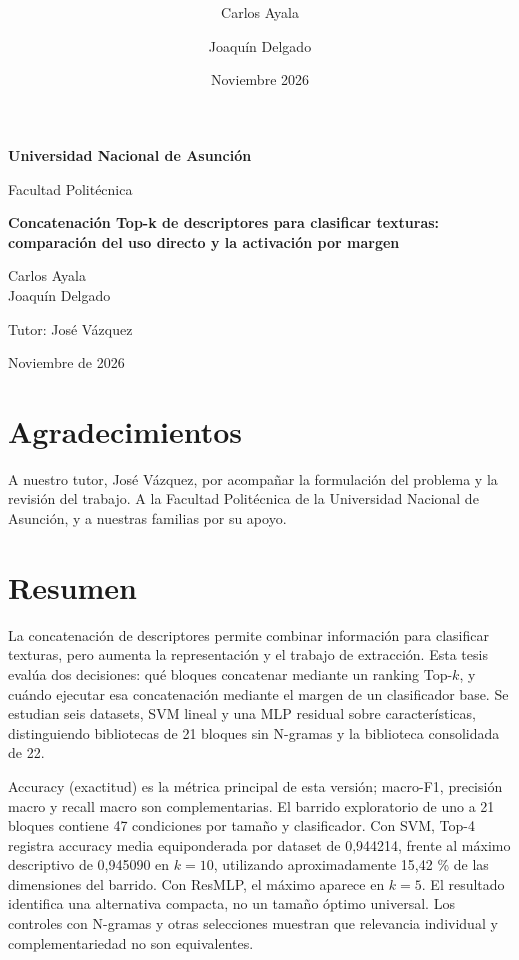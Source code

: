 \documentclass[12pt,a4paper]{report}
\title{\textbf{\titulotesis}}
\author{Carlos Ayala \and Joaquín Delgado}
\date{Noviembre 2026}
\newcommand{\titulotesis}{Concatenación Top-k de descriptores para clasificar texturas: comparación del uso directo y la activación por margen}
\begin{document}
\hypersetup{pageanchor=false}
\begin{titlepage}
\begin{center}
\vspace*{1.4cm}
{\Large\textbf{Universidad Nacional de Asunción}\par}
\vspace{0.4cm}
{\large Facultad Politécnica\par}
\vspace{1.7cm}
{\LARGE\bfseries\titulotesis\par}
\vspace{1.5cm}
{\large Carlos Ayala\\Joaquín Delgado\par}
\vspace{1.1cm}
{\large Tutor: José Vázquez\par}
\vfill
{\large Noviembre de 2026\par}
\end{center}
\end{titlepage}
\clearpage
{}
\hypersetup{pageanchor=true}

\chapter*{Agradecimientos}
A nuestro tutor, José Vázquez, por acompañar la formulación del problema y la revisión del trabajo. A la Facultad Politécnica de la Universidad Nacional de Asunción, y a nuestras familias por su apoyo.

\chapter*{Resumen}
La concatenación de descriptores permite combinar información para clasificar texturas, pero aumenta la representación y el trabajo de extracción. Esta tesis evalúa dos decisiones: qué bloques concatenar mediante un ranking Top-\(k\), y cuándo ejecutar esa concatenación mediante el margen de un clasificador base. Se estudian seis datasets, SVM lineal y una MLP residual sobre características, distinguiendo bibliotecas de 21 bloques sin N-gramas y la biblioteca consolidada de 22.

Accuracy (exactitud) es la métrica principal de esta versión; macro-F1, precisión macro y recall macro son complementarias. El barrido exploratorio de uno a 21 bloques contiene 47 condiciones por tamaño y clasificador. Con SVM, Top-4 registra accuracy media equiponderada por dataset de 0,944214, frente al máximo descriptivo de 0,945090 en \(k=10\), utilizando aproximadamente 15,42 \% de las dimensiones del barrido. Con ResMLP, el máximo aparece en \(k=5\). El resultado identifica una alternativa compacta, no un tamaño óptimo universal. Los controles con N-gramas y otras selecciones muestran que relevancia individual y complementariedad no son equivalentes.
\end{document}
